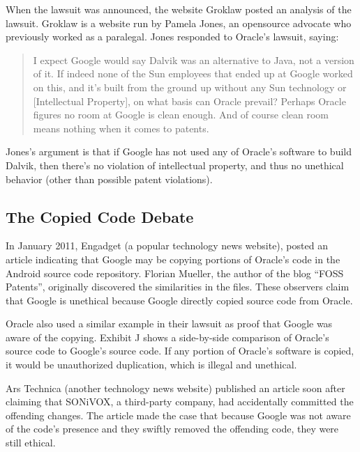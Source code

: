 \documentclass[11pt]{article}
\begin{document}
\begin{multicols}{2}
When the lawsuit was announced, the website Groklaw posted an analysis of the
lawsuit.  Groklaw is a website run by Pamela Jones, an \gls{opensource} advocate
who previously worked as a paralegal. \cite{groklaw-pj} Jones responded to
Oracle's lawsuit, saying: \cite{groklaw}

\begin{quotation}
I expect Google would say Dalvik was an alternative to Java, not a version of
it. If indeed none of the Sun employees that ended up at Google worked on this,
and it's built from the ground up without any Sun technology or [Intellectual
Property], on what basis can Oracle prevail? Perhaps Oracle figures no room at
Google is clean enough. And of course clean room means nothing when it comes to
patents.
\end{quotation}

Jones's argument is that if Google has not used any of Oracle's software to
build Dalvik, then there's no violation of intellectual property, and thus no
unethical behavior (other than possible patent violations).


\subsection{The Copied Code Debate} %
\label{sub:fosspatents}

In January 2011, Engadget (a popular technology news website), posted an article
indicating that Google may be copying portions of Oracle's code in the Android
source code repository.  \cite{android-copies-java-code}  Florian Mueller, the
author of the blog ``FOSS Patents'', originally discovered the similarities in
the files.  \cite{fosspatents} These observers claim that Google is unethical
because Google directly copied source code from Oracle.


Oracle also used a similar example in their lawsuit as proof that Google was
aware of the copying.  Exhibit J shows a side-by-side comparison of Oracle's
source code to Google's source code.  If any portion of Oracle's software is
copied, it would be unauthorized duplication, which is illegal and unethical.

Ars Technica (another technology news website) published an article soon after
claiming that SONiVOX, a third-party company, had accidentally committed the
offending changes.  \cite{ars-tech-copying}  The article made the case that
because Google was not aware of the code's presence and they swiftly removed the
offending code, they were still ethical.


\end{multicols}
\end{document}

